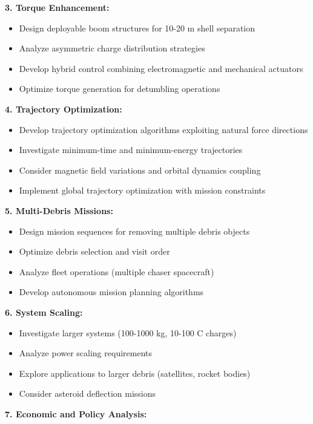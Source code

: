 \documentclass[12pt,a4paper]{article}
\begin{document}
\textbf{3. Torque Enhancement:}

\begin{itemize}
\item Design deployable boom structures for 10-20 m shell separation
\item Analyze asymmetric charge distribution strategies
\item Develop hybrid control combining electromagnetic and mechanical actuators
\item Optimize torque generation for detumbling operations
\end{itemize}

\textbf{4. Trajectory Optimization:}

\begin{itemize}
\item Develop trajectory optimization algorithms exploiting natural force directions
\item Investigate minimum-time and minimum-energy trajectories
\item Consider magnetic field variations and orbital dynamics coupling
\item Implement global trajectory optimization with mission constraints
\end{itemize}

\textbf{5. Multi-Debris Missions:}

\begin{itemize}
\item Design mission sequences for removing multiple debris objects
\item Optimize debris selection and visit order
\item Analyze fleet operations (multiple chaser spacecraft)
\item Develop autonomous mission planning algorithms
\end{itemize}

\textbf{6. System Scaling:}

\begin{itemize}
\item Investigate larger systems (100-1000 kg, 10-100 C charges)
\item Analyze power scaling requirements
\item Explore applications to larger debris (satellites, rocket bodies)
\item Consider asteroid deflection missions
\end{itemize}

\textbf{7. Economic and Policy Analysis:}
\end{document}
